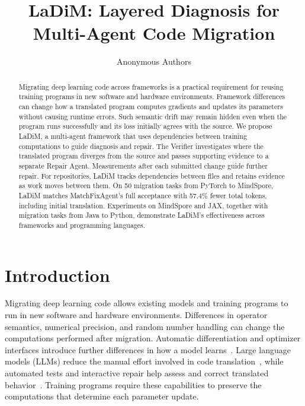 \documentclass{article}
\begin{document}
\title{LaDiM: Layered Diagnosis for\\
Multi-Agent Code Migration}

\author{Anonymous Authors}

\maketitle

\begin{abstract}
Migrating deep learning code across frameworks is a practical requirement for reusing training programs in new software and hardware environments. Framework differences can change how a translated program computes gradients and updates its parameters without causing runtime errors. Such semantic drift may remain hidden even when the program runs successfully and its loss initially agrees with the source. We propose LaDiM, a multi-agent framework that uses dependencies between training computations to guide diagnosis and repair. The Verifier investigates where the translated program diverges from the source and passes supporting evidence to a separate Repair Agent. Measurements after each submitted change guide further repair. For repositories, LaDiM tracks dependencies between files and retains evidence as work moves between them. On 50 migration tasks from PyTorch to MindSpore, LaDiM matches MatchFixAgent's full acceptance with 57.4\% fewer total tokens, including initial translation. Experiments on MindSpore and JAX, together with migration tasks from Java to Python, demonstrate LaDiM's effectiveness across frameworks and programming languages.
\end{abstract}

\section{Introduction}

Migrating deep learning code allows existing models and training programs to run in new software and hardware environments. Differences in operator semantics, numerical precision, and random number handling can change the computations performed after migration. Automatic differentiation and optimizer interfaces introduce further differences in how a model learns~\citep{paszke2019pytorch,mindspore2020whitepaper}. Large language models (LLMs) reduce the manual effort involved in code translation~\citep{he-etal-2025-execoder,macedo2024intertrans}, while automated tests and interactive repair help assess and correct translated behavior~\citep{roziere2021unittests,yang2024sweagent,ibrahimzada2025matchfixagent}. Training programs require these capabilities to preserve the computations that determine each parameter update.
\end{document}
